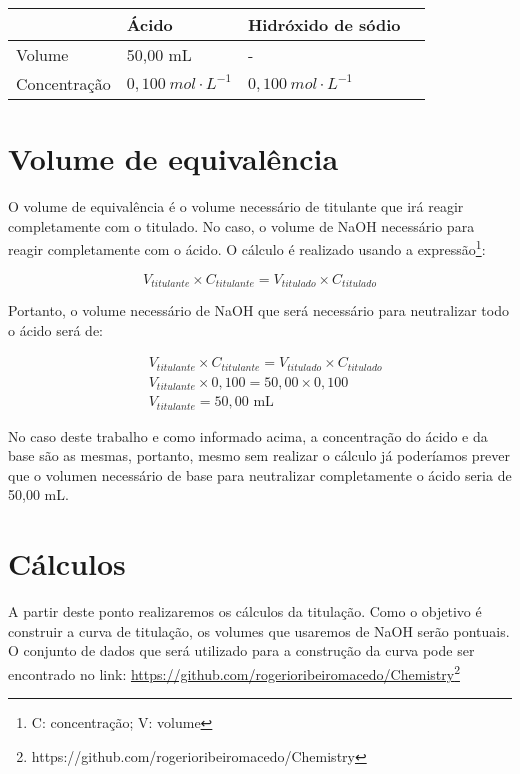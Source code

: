 \documentclass[a4paper, 12pt]{report}
\begin{document}
\begin{table}[H]
	\begin{center}
		\begin{tabular}{lp{5cm}lp{10cm}}\toprule
			& \textbf{Ácido} & \textbf{Hidróxido de sódio} \\ \midrule			
			Volume & 50,00 mL & - \\ 
			Concentração & $0,100 \: mol \cdot L^{-1}$ & $0,100 \: mol \cdot L^{-1}$ \\ 
			\bottomrule
		\end{tabular}
	\end{center}
\end{table}

\section{Volume de equivalência}
O volume de equivalência é o volume necessário de titulante que irá reagir completamente com o titulado. No caso, o volume de NaOH necessário para reagir completamente com o ácido. O cálculo é realizado usando a expressão\footnote{C: concentração; V: volume}:

\begin{equation*}
	V_{titulante} \times C_{titulante} = V_{titulado} \times C_{titulado}
\end{equation*}

Portanto, o volume necessário de NaOH que será necessário para neutralizar todo o ácido será de:
\begin{fleqn}
\begin{align*}
	& V_{titulante} \times C_{titulante} = V_{titulado} \times C_{titulado} \\
	& V_{titulante} \times 0,100 = 50,00 \times 0,100 \\
	& V_{titulante} = 50,00 \text{ mL}
\end{align*}
\end{fleqn}

No caso deste trabalho e como informado acima, a concentração do ácido e da base são as mesmas, portanto, mesmo sem realizar o cálculo já poderíamos prever que o volumen necessário de base para neutralizar completamente o ácido seria de 50,00 mL.

\section{Cálculos}
A partir deste ponto realizaremos os cálculos da titulação. Como o objetivo é construir a curva de titulação, os volumes que usaremos de NaOH serão pontuais. O conjunto de dados que será utilizado para a construção da curva pode ser encontrado no link: \href{https://github.com/rogerioribeiromacedo}{https://github.com/rogerioribeiromacedo/Chemistry}\footnote{https://github.com/rogerioribeiromacedo/Chemistry}
\end{document}
